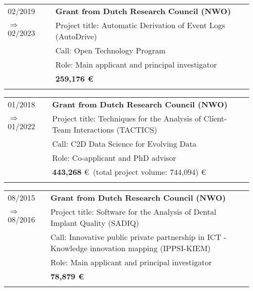 \raggedright
\begin{tabular}{P{3cm}P{12cm}}

02/2019  														& \textbf{Grant from Dutch Research Council (NWO)} \\
\hspace*{0.4cm} $\Rightarrow$ 02/2023 		& Project title: Automatic Derivation of Event Logs (AutoDrive) \\
																		& Call: Open Technology Program \\
																		& Role: Main applicant and principal investigator \\\noalign{\smallskip}
																		& \textbf{259,176 \euro} \\
																		& \\
																																				\end{tabular}														
\begin{tabular}{P{3cm}P{12cm}}
01/2018															& \textbf{Grant from Dutch Research Council (NWO)} \\
\hspace*{0.4cm} $\Rightarrow$ 01/2022 		& Project title: Techniques for the Analysis of Client-Team Interactions (TACTICS) \\
																		& Call: C2D Data Science for Evolving Data \\
																		& Role: Co-applicant and PhD advisor \\\noalign{\smallskip}
																		& \textbf{443,268} \euro \ (total project volume: 744,094) \euro \\
																		& \\
																		\end{tabular}														
\begin{tabular}{P{3cm}P{12cm}}
08/2015															& \textbf{Grant from Dutch Research Council (NWO)} \\
\hspace*{0.4cm} $\Rightarrow$ 08/2016 		& Project title: Software for the Analysis of Dental Implant Quality (SADIQ) \\
																		& Call: Innovative public private partnership in ICT - Knowledge innovation mapping (IPPSI-KIEM) \\
																		& Role: Main applicant and principal investigator \\\noalign{\smallskip}
																		& \textbf{78,879  \euro} \\
																		& \\
																		\end{tabular}														
